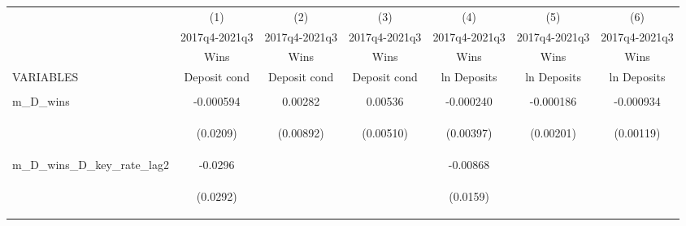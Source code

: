 \documentclass[]{article}
\begin{document}
\begin{center}
\begin{tabular}{lcccccc} \hline
 & (1) & (2) & (3) & (4) & (5) & (6) \\
 & 2017q4-2021q3 & 2017q4-2021q3 & 2017q4-2021q3 & 2017q4-2021q3 & 2017q4-2021q3 & 2017q4-2021q3 \\
 & Wins & Wins & Wins & Wins & Wins & Wins \\
VARIABLES & Deposit cond & Deposit cond & Deposit cond & ln Deposits & ln Deposits & ln Deposits \\ \hline
\vspace{4pt} & \begin{footnotesize}\end{footnotesize} & \begin{footnotesize}\end{footnotesize} & \begin{footnotesize}\end{footnotesize} & \begin{footnotesize}\end{footnotesize} & \begin{footnotesize}\end{footnotesize} & \begin{footnotesize}\end{footnotesize} \\
m\_D\_wins & -0.000594 & 0.00282 & 0.00536 & -0.000240 & -0.000186 & -0.000934 \\
\vspace{4pt} & \begin{footnotesize}(0.0209)\end{footnotesize} & \begin{footnotesize}(0.00892)\end{footnotesize} & \begin{footnotesize}(0.00510)\end{footnotesize} & \begin{footnotesize}(0.00397)\end{footnotesize} & \begin{footnotesize}(0.00201)\end{footnotesize} & \begin{footnotesize}(0.00119)\end{footnotesize} \\
m\_D\_wins\_D\_key\_rate\_lag2 & -0.0296 &  &  & -0.00868 &  &  \\
\vspace{4pt} & \begin{footnotesize}(0.0292)\end{footnotesize} & \begin{footnotesize}\end{footnotesize} & \begin{footnotesize}\end{footnotesize} & \begin{footnotesize}(0.0159)\end{footnotesize} & \begin{footnotesize}\end{footnotesize} & \begin{footnotesize}\end{footnotesize} \\

\end{tabular}
\end{center}
\end{document}
